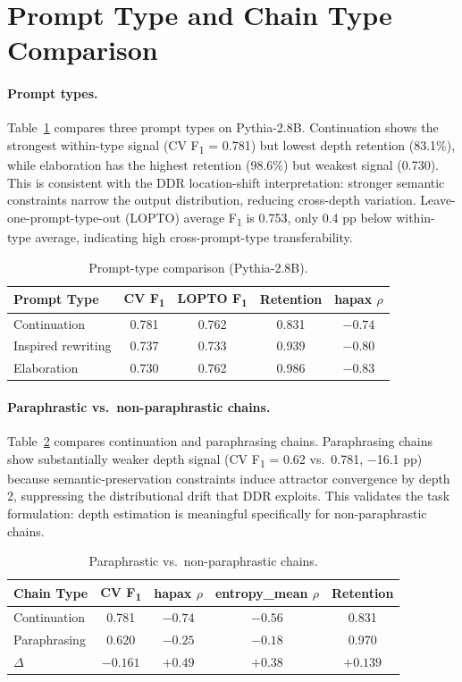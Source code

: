 \documentclass[11pt,a4paper]{article}
\newcommand{\fone}{F\textsubscript{1}}
\newcommand{\rhosp}{\rho}
\begin{document}
\section{Prompt Type and Chain Type Comparison}
\label{app:prompt}

\paragraph{Prompt types.}
Table~\ref{tab:prompt} compares three prompt types on Pythia-2.8B.
Continuation shows the strongest within-type signal (CV \fone{} = 0.781) but lowest depth retention (83.1\%),
while elaboration has the highest retention (98.6\%) but weakest signal (0.730).
This is consistent with the DDR location-shift interpretation: stronger semantic constraints narrow the output distribution, reducing cross-depth variation.
Leave-one-prompt-type-out (LOPTO) average \fone{} is 0.753, only 0.4 pp below within-type average, indicating high cross-prompt-type transferability.

\begin{table}[h]
\centering
\caption{Prompt-type comparison (Pythia-2.8B).}
\label{tab:prompt}
\begin{tabular}{lcccc}
\toprule
\textbf{Prompt Type} & \textbf{CV \fone{}} & \textbf{LOPTO \fone{}} & \textbf{Retention} & \textbf{hapax $\rhosp$} \\
\midrule
Continuation & 0.781 & 0.762 & 0.831 & $-0.74$ \\
Inspired rewriting & 0.737 & 0.733 & 0.939 & $-0.80$ \\
Elaboration & 0.730 & 0.762 & 0.986 & $-0.83$ \\
\bottomrule
\end{tabular}
\end{table}

\paragraph{Paraphrastic vs.\ non-paraphrastic chains.}
Table~\ref{tab:para} compares continuation and paraphrasing chains.
Paraphrasing chains show substantially weaker depth signal (CV \fone{} = 0.62 vs.\ 0.781, $-$16.1 pp)
because semantic-preservation constraints induce attractor convergence by depth 2,
suppressing the distributional drift that DDR exploits.
This validates the task formulation: depth estimation is meaningful specifically for non-paraphrastic chains.

\begin{table}[h]
\centering
\caption{Paraphrastic vs.\ non-paraphrastic chains.}
\label{tab:para}
\begin{tabular}{lcccc}
\toprule
\textbf{Chain Type} & \textbf{CV \fone{}} & \textbf{hapax $\rhosp$} & \textbf{entropy\_mean $\rhosp$} & \textbf{Retention} \\
\midrule
Continuation & 0.781 & $-0.74$ & $-0.56$ & 0.831 \\
Paraphrasing & 0.620 & $-0.25$ & $-0.18$ & 0.970 \\
\midrule
$\Delta$ & $-0.161$ & $+0.49$ & $+0.38$ & $+0.139$ \\
\bottomrule
\end{tabular}
\end{table}
\end{document}

